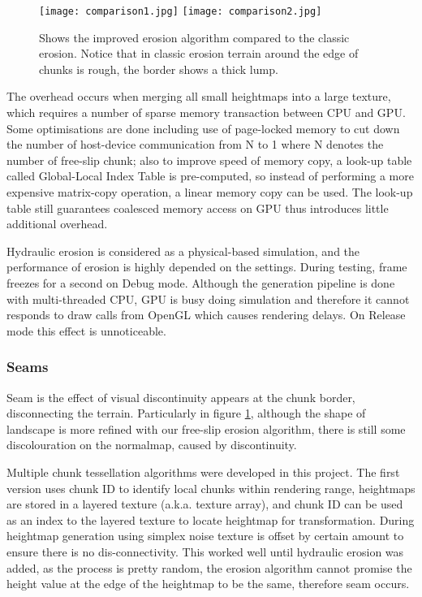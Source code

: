 \documentclass[oneside, a4paper]{article}
\begin{document}
    \begin{figure}[H]
        \center
        \texttt{[image: comparison1.jpg]}
        \texttt{[image: comparison2.jpg]}
        \caption{Shows the improved erosion algorithm compared to the classic erosion. Notice that in classic erosion terrain around the edge of chunks is rough, the border shows a thick lump.}
        \label{erosion_seams}
    \end{figure}

    The overhead occurs when merging all small heightmaps into a large texture, which requires a number of sparse memory transaction between CPU and GPU. Some optimisations are done including use of page-locked memory to cut down the number of host-device communication from N to 1 where N denotes the number of free-slip chunk; also to improve speed of memory copy, a look-up table called Global-Local Index Table is pre-computed, so instead of performing a more expensive matrix-copy operation, a linear memory copy can be used. The look-up table still guarantees coalesced memory access on GPU thus introduces little additional overhead.

    Hydraulic erosion is considered as a physical-based simulation, and the performance of erosion is highly depended on the settings. During testing, frame freezes for a second on Debug mode. Although the generation pipeline is done with multi-threaded CPU, GPU is busy doing simulation and therefore it cannot responds to draw calls from OpenGL which causes rendering delays. On Release mode this effect is unnoticeable.

    \subsubsection{Seams}

    Seam is the effect of visual discontinuity appears at the chunk border, disconnecting the terrain. Particularly in figure \ref{erosion_seams}, although the shape of landscape is more refined with our free-slip erosion algorithm, there is still some discolouration on the normalmap, caused by discontinuity.

    Multiple chunk tessellation algorithms were developed in this project. The first version uses chunk ID to identify local chunks within rendering range, heightmaps are stored in a layered texture (a.k.a. texture array), and chunk ID can be used as an index to the layered texture to locate heightmap for transformation. During heightmap generation using simplex noise texture is offset by certain amount to ensure there is no dis-connectivity. This worked well until hydraulic erosion was added, as the process is pretty random, the erosion algorithm cannot promise the height value at the edge of the heightmap to be the same, therefore seam occurs.
\end{document}
